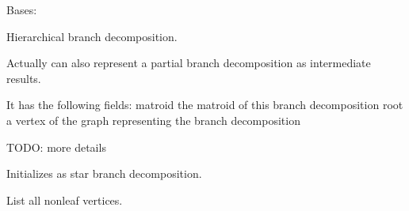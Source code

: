 \documentclass[letterpaper,12pt,english]{sphinxmanual}
\begin{document}
\begin{fulllineitems}
\label{\detokenize{api/modules:cbmpy.fluxmodules.decomposition.Decomposition}}
\pysigstartsignatures
\pysiglinewithargsret
{}
{}
{}
\pysigstopsignatures
\sphinxAtStartPar
Bases: 

\sphinxAtStartPar
Hierarchical branch decomposition.

\sphinxAtStartPar
Actually can also represent a partial branch decomposition as intermediate
results.

\sphinxAtStartPar
It has the following fields:
matroid \sphinxhyphen{} the matroid of this branch decomposition
root \sphinxhyphen{} a vertex of the graph representing the branch decomposition

\sphinxAtStartPar
TODO: more details

\begin{fulllineitems}
\label{\detokenize{api/modules:cbmpy.fluxmodules.decomposition.Decomposition.__init__}}
\pysigstartsignatures
\pysiglinewithargsret
{}
{}
{}
\pysigstopsignatures
\sphinxAtStartPar
Initializes as star branch decomposition.

\end{fulllineitems}


\begin{fulllineitems}
\label{\detokenize{api/modules:cbmpy.fluxmodules.decomposition.Decomposition.listNonLeaves}}
\pysigstartsignatures
\pysiglinewithargsret
{}
{}
{}
\pysigstopsignatures
\sphinxAtStartPar
List all non\sphinxhyphen{}leaf vertices.

\end{fulllineitems}



\end{fulllineitems}
\end{document}
